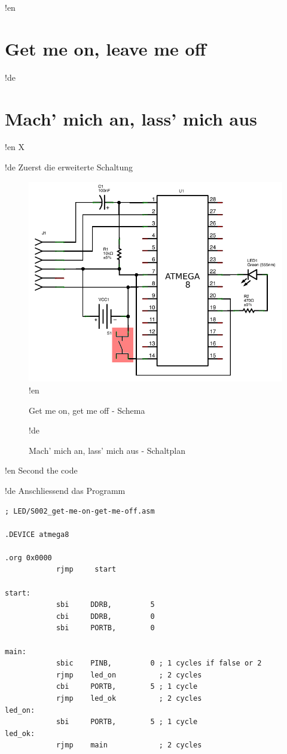 !en \section{Get me on, leave me off}
!de \section{Mach' mich an, lass' mich aus}

!en X

!de Zuerst die erweiterte Schaltung

\begin{figure}[htbp]
  \centering
  \includegraphics[width=120mm]{LED/S002_get-me-on-get-me-off_Circuit_schema.png}
!en   \caption{Get me on, get me off - Schema}
!de   \caption{Mach' mich an, lass' mich aus - Schaltplan}
  \label{atmega8-get-me-on-get-me-off-schema}
  \label{atmega8-get-me-on-get-me-off-schema}
\end{figure}


!en Second the code

!de Anschliessend das Programm


\begin{lstlisting}
; LED/S002_get-me-on-get-me-off.asm

.DEVICE atmega8

.org 0x0000
            rjmp     start

start:
            sbi     DDRB,         5
            cbi     DDRB,         0
            sbi     PORTB,        0

main:
            sbic    PINB,         0 ; 1 cycles if false or 2
            rjmp    led_on          ; 2 cycles
            cbi     PORTB,        5 ; 1 cycle
            rjmp    led_ok          ; 2 cycles
led_on:
            sbi     PORTB,        5 ; 1 cycle
led_ok:
            rjmp    main            ; 2 cycles
\end{lstlisting}

